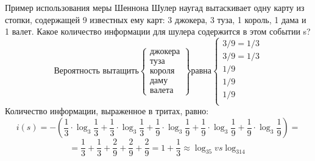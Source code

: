 \begin{frame}[t]{Пример использования меры Шеннона}
	\noindent Шулер наугад вытаскивает одну карту из стопки, содержащей 9 известных ему карт: 3 джокера, 3 туза, 1 король, 1 дама и 1 валет. Какое количество информации для шулера содержится в этом событии s?
	$$\mbox{Вероятность вытащить} \left\{
	\begin{array}{l}
		\mbox{джокера}\\
		\mbox{туза}\\
		\mbox{короля}\\
		\mbox{даму}\\
		\mbox{валета}
	\end{array}
	\right\}\mbox{равна}\left\{
	\begin{array}{l}
		3/9=1/3\\
		3/9=1/3\\
		1/9\\
		1/9\\
		1/9\\
	\end{array}	
	\right .$$
	Количество информации, выраженное в тритах, равно:
		$$i(s)=-\left(\frac{1}{3}\cdot\log_3\frac{1}{3}+\frac{1}{3}\cdot\log_3\frac{1}{3}+\frac{1}{9}\cdot\log_3\frac{1}{9}+\frac{1}{9}\cdot\log_3\frac{1}{9}+\frac{1}{9}\cdot\log_3\frac{1}{9}\right)=$$
		$$=\frac{1}{3}+\frac{1}{3}+\frac{2}{9}+\frac{2}{9}+\frac{2}{9}=1+\frac{1}{3}\approx\log_35vs\log_314$$
\end{frame}